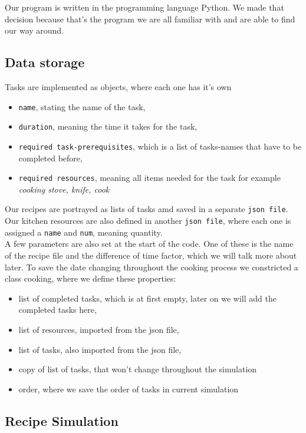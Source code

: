 
Our program is written in the programming language Python. We made that decision because that's the program we are all familiar with and are able to find our way around. 

\subsection{Data storage}

Tasks are implemented as objects, where each one has it's own 
\begin{itemize}
    \item \texttt{name}, stating the name of the task,
    \item \texttt{duration}, meaning the time it takes for the task,
    \item \texttt{required task-prerequisites}, which is a list of tasks-names that have to be completed before,
    \item \texttt{required resources}, meaning all items needed for the task
    for example \textit{cooking stove, knife, cook}
\end{itemize}

Our recipes are portrayed as lists of tasks amd saved in a separate \texttt{json file}. Our kitchen resources are also defined in another \texttt{json file}, where each one is assigned a \texttt{name} and \texttt{num}, meaning quantity. \\
A few parameters are also set at the start of the code. One of these is the name of the recipe file and the difference of time factor, which we will talk more about later.
To save the date changing throughout the cooking process we constricted a class cooking, where we define these properties:
\begin{itemize}
    \item list of completed tasks, which is at first empty, later on we will add the completed tasks here,
    \item list of resources, imported from the json file,
    \item list of tasks, also imported from the json file,
    \item copy of list of tasks, that won't change throughout the simulation
    \item order, where we save the order of tasks in current simulation
\end{itemize}

\subsection{Recipe Simulation}

